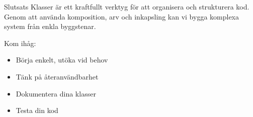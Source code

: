 \begin{frame}[fragile]
  \begin{block}{Slutsats}
    Klasser är ett kraftfullt verktyg för att organisera och strukturera kod.
    Genom att använda komposition, arv och inkapsling kan vi bygga komplexa 
    system från enkla byggstenar.
    
    Kom ihåg:
    \begin{itemize}
      \item Börja enkelt, utöka vid behov
      \item Tänk på återanvändbarhet
      \item Dokumentera dina klasser
      \item Testa din kod
    \end{itemize}
  \end{block}
\end{frame}

